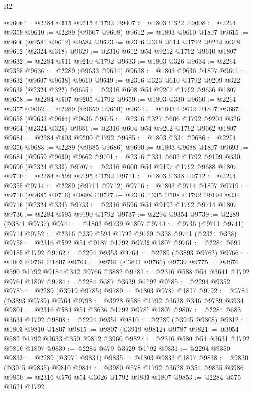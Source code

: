 \begin{lexlean}{R2}
\begin{coremodule}
@9606 := @2284 @615 @9215 @1792
@9607 := @1803 @322
@9608 := @2294 @9359
@9610 := @2289 (@9607 @9608)
@9612 := @1803 @9610 @1807
@9615 := @9606 (@9581 @9612) @9584
@9623 := @2316 @319 @614 @1792 @9214 @318 @9612 (@2324 @318)
@9629 := @2316 @612 @54 @9212 @1792 @9610 @1807
@9632 := @2284 @611 @9210 @1792
@9633 := @1803 @326
@9634 := @2294 @9358
@9636 := @2289 (@9633 @9634)
@9638 := @1803 @9636 @1807
@9641 := @9632 (@9607 @9638) @9610
@9649 := @2316 @323 @610 @1792 @9209 @322 @9638 (@2324 @322)
@9655 := @2316 @608 @54 @9207 @1792 @9636 @1807
@9658 := @2284 @607 @9205 @1792
@9659 := @1803 @330
@9660 := @2294 @9357
@9662 := @2289 (@9659 @9660)
@9664 := @1803 @9662 @1807
@9667 := @9658 (@9633 @9664) @9636
@9675 := @2316 @327 @606 @1792 @9204 @326 @9664 (@2324 @326)
@9681 := @2316 @604 @54 @9202 @1792 @9662 @1807
@9684 := @2284 @603 @9200 @1792
@9685 := @1803 @334
@9686 := @2294 @9356
@9688 := @2289 (@9685 @9686)
@9690 := @1803 @9688 @1807
@9693 := @9684 (@9659 @9690) @9662
@9701 := @2316 @331 @602 @1792 @9199 @330 @9690 (@2324 @330)
@9707 := @2316 @600 @54 @9197 @1792 @9688 @1807
@9710 := @2284 @599 @9195 @1792
@9711 := @1803 @338
@9712 := @2294 @9355
@9714 := @2289 (@9711 @9712)
@9716 := @1803 @9714 @1807
@9719 := @9710 (@9685 @9716) @9688
@9727 := @2316 @335 @598 @1792 @9194 @334 @9716 (@2324 @334)
@9733 := @2316 @596 @54 @9192 @1792 @9714 @1807
@9736 := @2284 @595 @9190 @1792
@9737 := @2294 @9354
@9739 := @2289 (@3841 @9737)
@9741 := @1803 @9739 @1807
@9744 := @9736 (@9711 @9741) @9714
@9752 := @2316 @339 @594 @1792 @9189 @338 @9741 (@2324 @338)
@9758 := @2316 @592 @54 @9187 @1792 @9739 @1807
@9761 := @2284 @591 @9185 @1792
@9762 := @2294 @9353
@9764 := @2289 (@3893 @9762)
@9766 := @1803 @9764 @1807
@9769 := @9761 (@3841 @9766) @9739
@9775 := @3876 @590 @1792 @9184 @342 @9766 @3882
@9781 := @2316 @588 @54 @3641 @1792 @9764 @1807
@9784 := @2284 @587 @3639 @1792
@9785 := @2294 @9352
@9787 := @2289 (@3919 @9785)
@9789 := @1803 @9787 @1807
@9792 := @9784 (@3893 @9789) @9764
@9798 := @3928 @586 @1792 @3638 @346 @9789 @3934
@9804 := @2316 @584 @54 @3636 @1792 @9787 @1807
@9807 := @2284 @583 @3634 @1792
@9808 := @2294 @9351
@9810 := @2289 (@3945 @9808)
@9812 := @1803 @9810 @1807
@9815 := @9807 (@3919 @9812) @9787
@9821 := @3954 @582 @1792 @3633 @350 @9812 @3960
@9827 := @2316 @580 @54 @3631 @1792 @9810 @1807
@9830 := @2284 @579 @3629 @1792
@9831 := @2294 @9350
@9833 := @2289 (@3971 @9831)
@9835 := @1803 @9833 @1807
@9838 := @9830 (@3945 @9835) @9810
@9844 := @3980 @578 @1792 @3628 @354 @9835 @3986
@9850 := @2316 @576 @54 @3626 @1792 @9833 @1807
@9853 := @2284 @575 @3624 @1792

\end{coremodule}
\end{lexlean}
